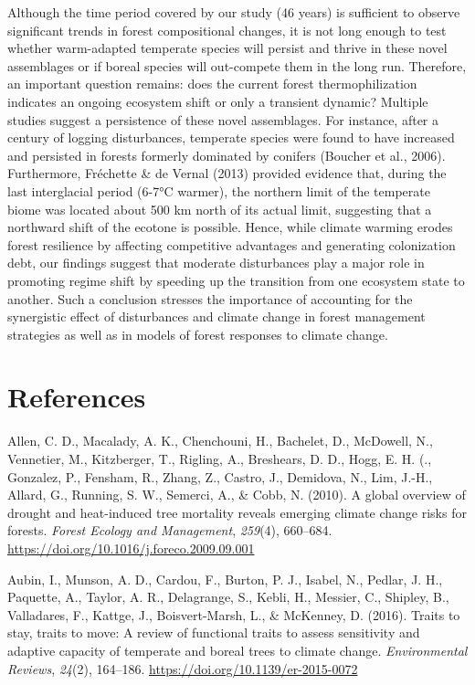 \documentclass[
  a4paperpaper,
]{article}
\begin{document}
Although the time period covered by our study (46 years) is sufficient
to observe significant trends in forest compositional changes, it is not
long enough to test whether warm-adapted temperate species will persist
and thrive in these novel assemblages or if boreal species will
out-compete them in the long run. Therefore, an important question
remains: does the current forest thermophilization indicates an ongoing
ecosystem shift or only a transient dynamic? Multiple studies suggest a
persistence of these novel assemblages. For instance, after a century of
logging disturbances, temperate species were found to have increased and
persisted in forests formerly dominated by conifers (Boucher et al.,
2006). Furthermore, Fréchette \& de Vernal (2013) provided evidence
that, during the last interglacial period (6-7°C warmer), the northern
limit of the temperate biome was located about 500 km north of its
actual limit, suggesting that a northward shift of the ecotone is
possible. Hence, while climate warming erodes forest resilience by
affecting competitive advantages and generating colonization debt, our
findings suggest that moderate disturbances play a major role in
promoting regime shift by speeding up the transition from one ecosystem
state to another. Such a conclusion stresses the importance of
accounting for the synergistic effect of disturbances and climate change
in forest management strategies as well as in models of forest responses
to climate change.

\pagebreak

\hypertarget{references}{%
\section{References}\label{references}}

\hypertarget{refs}{}
\leavevmode\hypertarget{ref-allen_global_2010}{}%
Allen, C. D., Macalady, A. K., Chenchouni, H., Bachelet, D., McDowell,
N., Vennetier, M., Kitzberger, T., Rigling, A., Breshears, D. D., Hogg,
E. H. (., Gonzalez, P., Fensham, R., Zhang, Z., Castro, J., Demidova,
N., Lim, J.-H., Allard, G., Running, S. W., Semerci, A., \& Cobb, N.
(2010). A global overview of drought and heat-induced tree mortality
reveals emerging climate change risks for forests. \emph{Forest Ecology
and Management}, \emph{259}(4), 660--684.
\url{https://doi.org/10.1016/j.foreco.2009.09.001}

\leavevmode\hypertarget{ref-aubin_traits_2016}{}%
Aubin, I., Munson, A. D., Cardou, F., Burton, P. J., Isabel, N., Pedlar,
J. H., Paquette, A., Taylor, A. R., Delagrange, S., Kebli, H., Messier,
C., Shipley, B., Valladares, F., Kattge, J., Boisvert-Marsh, L., \&
McKenney, D. (2016). Traits to stay, traits to move: A review of
functional traits to assess sensitivity and adaptive capacity of
temperate and boreal trees to climate change. \emph{Environmental
Reviews}, \emph{24}(2), 164--186.
\url{https://doi.org/10.1139/er-2015-0072}
\end{document}
